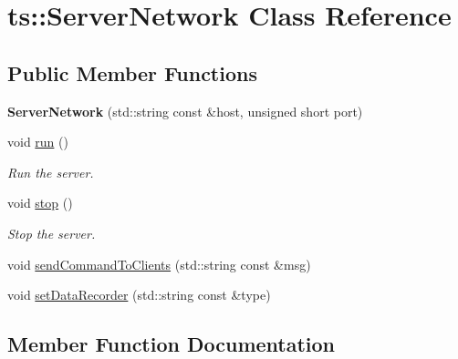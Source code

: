 \hypertarget{classts_1_1_server_network}{}\section{ts\+:\+:Server\+Network Class Reference}
\label{classts_1_1_server_network}
\subsection*{Public Member Functions}
\begin{DoxyCompactItemize}
\item 
\mbox{\label{classts_1_1_server_network_ada7926cb2eb2f3f18ab41053cc8a32c3}} 
{\bfseries Server\+Network} (std\+::string const \&host, unsigned short port)
\item 
\mbox{\label{classts_1_1_server_network_a4b36b2dff596d614deb17ad73aa0af16}} 
void \hyperlink{classts_1_1_server_network_a4b36b2dff596d614deb17ad73aa0af16}{run} ()
\begin{DoxyCompactList}\small\item\em Run the server. \end{DoxyCompactList}\item 
\mbox{\label{classts_1_1_server_network_aa3daa3076aa7213e98ce1527ad7f8926}} 
void \hyperlink{classts_1_1_server_network_aa3daa3076aa7213e98ce1527ad7f8926}{stop} ()
\begin{DoxyCompactList}\small\item\em Stop the server. \end{DoxyCompactList}\item 
void \hyperlink{classts_1_1_server_network_a4b7eb1900ddcd753e95b77e4e4b08931}{send\+Command\+To\+Clients} (std\+::string const \&msg)
\item 
void \hyperlink{classts_1_1_server_network_aa615cf28d248391c13d2f1dfb97b8d1e}{set\+Data\+Recorder} (std\+::string const \&type)
\end{DoxyCompactItemize}


\subsection{Member Function Documentation}
\mbox{\label{classts_1_1_server_network_a4b7eb1900ddcd753e95b77e4e4b08931}} 
